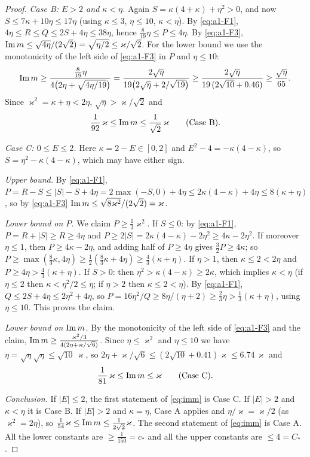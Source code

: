 \begin{proof}
\emph{Case B: $E>2$ and $\kappa<\eta$.} Again $S=\kappa(4+\kappa)+\eta^2>0$, and now $S\le7\kappa+10\eta\le17\eta$ (using $\kappa\le3$, $\eta\le10$, $\kappa<\eta$). By \eqref{eq:a1-F1}, $4\eta\le R\le Q\le2S+4\eta\le38\eta$, hence
$\frac8{19}\eta\le P\le4\eta$. By \eqref{eq:a1-F3}, $\operatorname{Im} m\le\sqrt{4\eta}/(2\sqrt2)=\sqrt{\eta/2}\le\varkappa/\sqrt2$. For the lower bound we use the monotonicity of the left side of \eqref{eq:a1-F3} in $P$ and $\eta\le10$:
\[
 \operatorname{Im} m\ge\frac{\frac8{19}\eta}{4\big(2\eta+\sqrt{4\eta/19}\big)}=\frac{2\sqrt\eta}{19\big(2\sqrt\eta+2/\sqrt{19}\big)}\ge\frac{2\sqrt\eta}{19\,(2\sqrt{10}+0.46)}\ge\frac{\sqrt\eta}{65} .
\]
Since $\varkappa^2=\kappa+\eta<2\eta$, $\sqrt\eta>\varkappa/\sqrt2$ and
\[
 \frac1{92}\,\varkappa\le\operatorname{Im} m\le\frac1{\sqrt2}\,\varkappa\qquad(\text{Case B}).
\]

\emph{Case C: $0\le E\le2$.} Here $\kappa=2-E\in[0,2]$ and $E^2-4=-\kappa(4-\kappa)$, so $S=\eta^2-\kappa(4-\kappa)$, which may have either sign.

\emph{Upper bound.} By \eqref{eq:a1-F1}, $P=R-S\le|S|-S+4\eta=2\max(-S,0)+4\eta\le2\kappa(4-\kappa)+4\eta\le8(\kappa+\eta)$, so by \eqref{eq:a1-F3} $\operatorname{Im} m\le\sqrt{8\varkappa^2}/(2\sqrt2)=\varkappa$.

\emph{Lower bound on $P$.} We claim $P\ge\frac13\varkappa^2$.
If $S\le0$: by \eqref{eq:a1-F1}, $P=R+|S|\ge R\ge4\eta$ and $P\ge2|S|=2\kappa(4-\kappa)-2\eta^2\ge4\kappa-2\eta^2$. If moreover $\eta\le1$, then $P\ge4\kappa-2\eta$, and adding half of $P\ge4\eta$ gives $\frac32P\ge4\kappa$; so
$P\ge\max(\frac83\kappa,4\eta)\ge\frac12(\frac83\kappa+4\eta)\ge\frac43(\kappa+\eta)$. If $\eta>1$, then $\kappa\le2<2\eta$ and $P\ge4\eta>\frac43(\kappa+\eta)$.
If $S>0$: then $\eta^2>\kappa(4-\kappa)\ge2\kappa$, which implies $\kappa<\eta$ (if $\eta\le2$ then $\kappa<\eta^2/2\le\eta$; if $\eta>2$ then $\kappa\le2<\eta$). By \eqref{eq:a1-F1}, $Q\le2S+4\eta\le2\eta^2+4\eta$, so
$P=16\eta^2/Q\ge8\eta/(\eta+2)\ge\frac23\eta>\frac13(\kappa+\eta)$, using $\eta\le10$. This proves the claim.

\emph{Lower bound on $\operatorname{Im} m$.} By the monotonicity of the left side of \eqref{eq:a1-F3} and the claim,
$\operatorname{Im} m\ge\frac{\varkappa^2/3}{4(2\eta+\varkappa/\sqrt6)}$. Since $\eta\le\varkappa^2$ and $\eta\le10$ we have $\eta=\sqrt\eta\sqrt\eta\le\sqrt{10}\,\varkappa$, so $2\eta+\varkappa/\sqrt6\le(2\sqrt{10}+0.41)\varkappa\le6.74\,\varkappa$ and
\[
 \frac1{81}\,\varkappa\le\operatorname{Im} m\le\varkappa\qquad(\text{Case C}).
\]

\emph{Conclusion.} If $|E|\le2$, the first statement of \eqref{eq:imm} is Case C. If $|E|>2$ and $\kappa<\eta$ it is Case B. If $|E|>2$ and $\kappa=\eta$, Case A applies and $\eta/\varkappa=\varkappa/2$ (as $\varkappa^2=2\eta$), so
$\frac1{54}\varkappa\le\operatorname{Im} m\le\frac1{2\sqrt2}\varkappa$. The second statement of \eqref{eq:imm} is Case A. All the lower constants are $\ge\frac1{150}=c_*$ and all the upper constants are $\le4=C_*$.


\end{proof}
